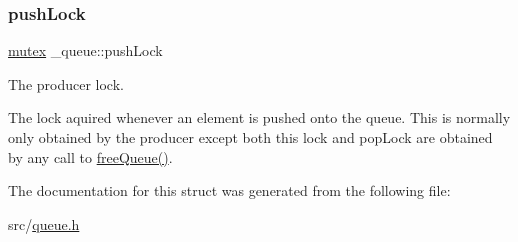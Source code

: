 \subsubsection{\texorpdfstring{push\+Lock}{pushLock}}
{\footnotesize\ttfamily \hyperlink{queue_8h_a8c80af1d72030a9dc70c3a2c3e46ae9a}{mutex} \+\_\+queue\+::push\+Lock}



The producer lock. 

The lock aquired whenever an element is pushed onto the queue. This is normally only obtained by the producer except both this lock and pop\+Lock are obtained by any call to \hyperlink{queue_8h_aa4727b72ed89cd406d2809482181b959}{free\+Queue()}. 

The documentation for this struct was generated from the following file\+:\begin{DoxyCompactItemize}
\item 
src/\hyperlink{queue_8h}{queue.\+h}\end{DoxyCompactItemize}
